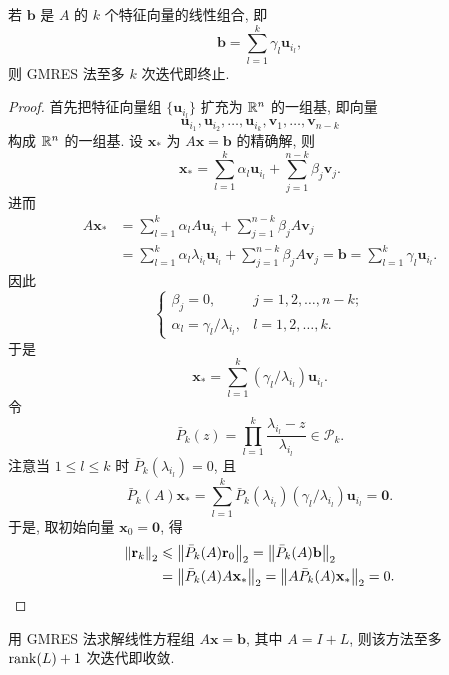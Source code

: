 \begin{theorem}
\label{thm:6-12}
若 $\mathbf{b}$ 是 $A$ 的 $k$ 个特征向量的线性组合, 即
\[
  \mathbf{b}=\sum_{l=1}^{k}\gamma_l\mathbf{u}_{i_l},
\]
则 GMRES 法至多 $k$ 次迭代即终止.
\end{theorem}

\begin{proof}
首先把特征向量组 $\{\mathbf{u}_{i_l}\}$ 扩充为 $\mathbb{R}^n$ 的一组基, 即向量
\[
  \mathbf{u}_{i_1},\mathbf{u}_{i_2},\ldots,\mathbf{u}_{i_k},
  \mathbf{v}_1,\ldots,\mathbf{v}_{n-k}
\]
构成 $\mathbb{R}^n$ 的一组基. 设 $\mathbf{x}_*$ 为 $A\mathbf{x}=\mathbf{b}$ 的精确解, 则
\[
  \mathbf{x}_*=\sum_{l=1}^{k}\alpha_l\mathbf{u}_{i_l}
  +\sum_{j=1}^{n-k}\beta_j\mathbf{v}_j.
\]
进而
\[
  \begin{aligned}
    A\mathbf{x}_*&=\sum_{l=1}^{k}\alpha_lA\mathbf{u}_{i_l}
      +\sum_{j=1}^{n-k}\beta_jA\mathbf{v}_j\\
    &=\sum_{l=1}^{k}\alpha_l\lambda_{i_l}\mathbf{u}_{i_l}
      +\sum_{j=1}^{n-k}\beta_jA\mathbf{v}_j
     =\mathbf{b}=\sum_{l=1}^{k}\gamma_l\mathbf{u}_{i_l}.
  \end{aligned}
\]
因此
\[
  \left\{
  \begin{array}{ll}
    \beta_j=0, & j=1,2,\ldots,n-k;\\
    \alpha_l=\gamma_l/\lambda_{i_l}, & l=1,2,\ldots,k.
  \end{array}
  \right.
\]
于是
\[
  \mathbf{x}_*=\sum_{l=1}^{k}(\gamma_l/\lambda_{i_l})\mathbf{u}_{i_l}.
\]
令
\[
  \bar{P}_k(z)=\prod_{l=1}^{k}\frac{\lambda_{i_l}-z}{\lambda_{i_l}}
  \in\mathcal{P}_k.
\]
注意当 $1\leqslant l\leqslant k$ 时 $\bar{P}_k(\lambda_{i_l})=0$, 且
\[
  \bar{P}_k(A)\mathbf{x}_*=\sum_{l=1}^{k}\bar{P}_k(\lambda_{i_l})
  (\gamma_l/\lambda_{i_l})\mathbf{u}_{i_l}=\mathbf{0}.
\]
于是, 取初始向量 $\mathbf{x}_0=\mathbf{0}$, 得
\[
  \begin{aligned}
    \left\|\mathbf{r}_k\right\|_2
    &\leqslant\left\|\bar{P}_k(A)\mathbf{r}_0\right\|_2
     =\left\|\bar{P}_k(A)\mathbf{b}\right\|_2\\
    &=\left\|\bar{P}_k(A)A\mathbf{x}_*\right\|_2
     =\left\|A\bar{P}_k(A)\mathbf{x}_*\right\|_2=0.
  \end{aligned}
\]
\end{proof}

\begin{theorem}
\label{thm:6-13}
用 GMRES 法求解线性方程组 $A\mathbf{x}=\mathbf{b}$, 其中 $A=I+L$, 则该方法至多 $\operatorname{rank}(L)+1$ 次迭代即收敛.
\end{theorem}

